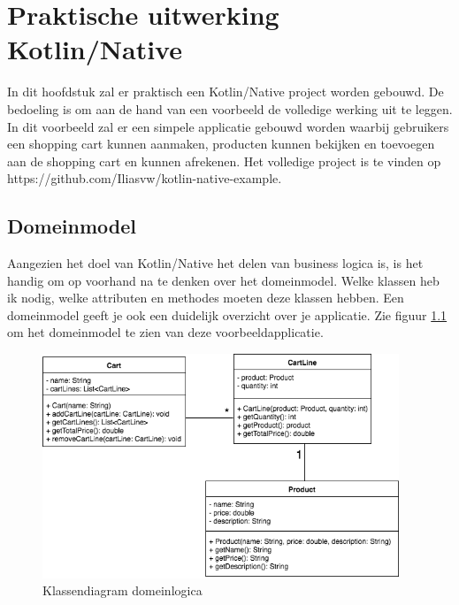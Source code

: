 \chapter{Praktische uitwerking Kotlin/Native}
\label{ch:praktisch}
In dit hoofdstuk zal er praktisch een Kotlin/Native project worden gebouwd. De bedoeling is om aan de hand van een voorbeeld de volledige werking uit te leggen. In dit voorbeeld zal er een simpele applicatie gebouwd worden waarbij gebruikers een shopping cart kunnen aanmaken, producten kunnen bekijken en toevoegen aan de shopping cart en kunnen afrekenen. Het volledige project is te vinden op 
https://github.com/Iliasvw/kotlin-native-example.

\section{Domeinmodel}
Aangezien het doel van Kotlin/Native het delen van business logica is, is het handig om op voorhand na te denken over het domeinmodel. Welke klassen heb ik nodig, welke attributen en methodes moeten deze klassen hebben. Een domeinmodel geeft je ook een duidelijk overzicht over je applicatie. Zie figuur \ref{fig:domeinmodel-kn} om het domeinmodel te zien van deze voorbeeldapplicatie.

\begin{figure} [ht]
	\centering
	\includegraphics[width=0.95\textwidth]{img/domeinmodel.png}
	\caption{Klassendiagram domeinlogica}
	\label{fig:domeinmodel-kn}
\end{figure}

